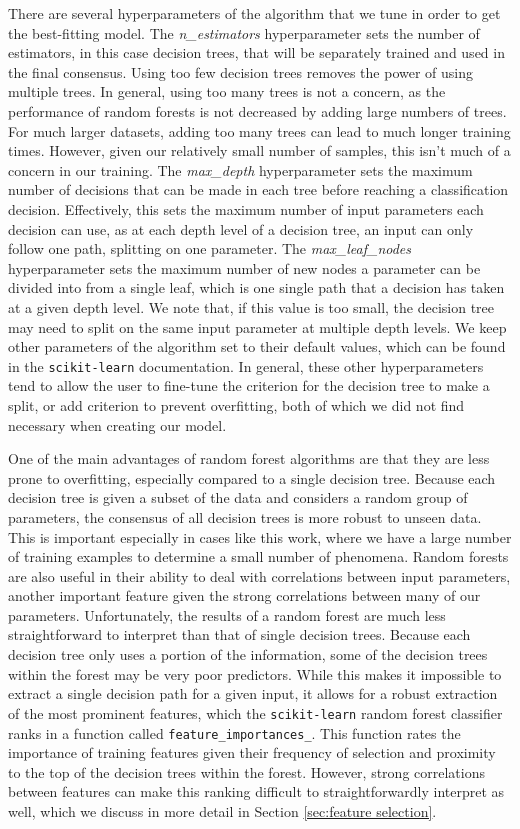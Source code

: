 \documentclass[fleqn,usenatbib]{mnras}
\begin{document}
There are several hyperparameters of the algorithm that we tune in order to get the best-fitting model. The \textit{n\_estimators} hyperparameter sets the number of estimators, in this case decision trees, that will be separately trained and used in the final consensus. Using too few decision trees removes the power of using multiple trees. In general, using too many trees is not a concern, as the performance of random forests is not decreased by adding large numbers of trees. For much larger datasets, adding too many trees can lead to much longer training times. However, given our relatively small number of samples, this isn't much of a concern in our training.  The \textit{max\_depth} hyperparameter sets the maximum number of decisions that can be made in each tree before reaching a classification decision. Effectively, this sets the maximum number of input parameters each decision can use, as at each depth level of a decision tree, an input can only follow one path, splitting on one parameter. The \textit{max\_leaf\_nodes} hyperparameter sets the maximum number of new nodes a parameter can be divided into from a single leaf, which is one single path that a decision has taken at a given depth level. We note that, if this value is too small, the decision tree may need to split on the same input parameter at multiple depth levels. We keep other parameters of the algorithm set to their default values, which can be found in the \texttt{scikit-learn} documentation. In general, these other hyperparameters tend to allow the user to fine-tune the criterion for the decision tree to make a split, or add criterion to prevent overfitting, both of which we did not find necessary when creating our model.

One of the main advantages of random forest algorithms are that they are less prone to overfitting, especially compared to a single decision tree. Because each decision tree is given a subset of the data and considers a random group of parameters, the consensus of all decision trees is more robust to unseen data. This is important especially in cases like this work, where we have a large number of training examples to determine a small number of phenomena. Random forests are also useful in their ability to deal with correlations between input parameters, another important feature given the strong correlations between many of our parameters. Unfortunately, the results of a random forest are much less straightforward to interpret than that of single decision trees. Because each decision tree only uses a portion of the information, some of the decision trees within the forest may be very poor predictors. While this makes it impossible to extract a single decision path for a given input, it allows for a robust extraction of the most prominent features, which the \texttt{scikit-learn} random forest classifier ranks in a function called \texttt{feature\_importances\_}. This function rates the importance of training features given their frequency of selection and proximity to the top of the decision trees within the forest. However, strong correlations between features can make this ranking difficult to straightforwardly interpret as well, which we discuss in more detail in Section \ref{sec:feature selection}.
\end{document}
